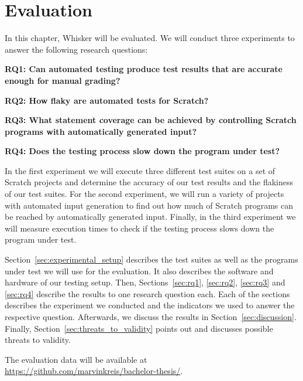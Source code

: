 \chapter{Evaluation}%
\label{cha:evaluation}

In this chapter, Whisker will be evaluated.
We will conduct three experiments to answer the following research questions:

{
    \parspace

    \centering
    \begin{minipage}{.9\textwidth}
        \textbf{RQ1: Can automated testing produce test results that are accurate enough for manual grading?}
        \parspace

        \textbf{RQ2: How flaky are automated tests for Scratch?}
        \parspace

        \textbf{RQ3: What statement coverage can be achieved by controlling Scratch programs with automatically generated input?}
        \parspace

        \textbf{RQ4: Does the testing process slow down the program under test?}
    \end{minipage}

    \parspace
}


\noindent In the first experiment we will execute three different test suites on a set of Scratch projects
and determine the accuracy of our test results and the flakiness of our test suites.
For the second experiment, we will run a variety of projects with automated input generation
to find out how much of Scratch programs can be reached by automatically generated input.
Finally, in the third experiment we will measure execution times
to check if the testing process slows down the program under test.
\parspace

Section~\ref{sec:experimental_setup} describes the test suites as well as the programs under test we will use for the evaluation.
It also describes the software and hardware of our testing setup.
Then, Sections~\ref{sec:rq1}, \ref{sec:rq2}, \ref{sec:rq3} and \ref{sec:rq4} describe the results to one research question each.
Each of the sections describes the experiment we conducted and the indicators we used
to answer the respective question.
Afterwards, we discuss the results in Section~\ref{sec:discussion}.
Finally, Section~\ref{sec:threats_to_validity} points out and discusses possible threats to validity.%
\parspace

The evaluation data will be available at \url{https://github.com/marvinkreis/bachelor-thesis/}.

